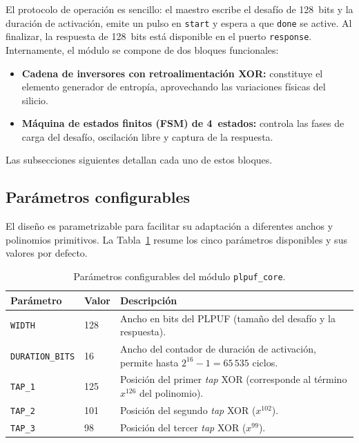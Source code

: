 El protocolo de operación es sencillo: el maestro escribe el desafío de
128~bits y la duración de activación, emite un pulso en \texttt{start} y
espera a que \texttt{done} se active. Al finalizar, la respuesta de
128~bits está disponible en el puerto \texttt{response}. Internamente, el
módulo se compone de dos bloques funcionales:

\begin{itemize}
  \item \textbf{Cadena de inversores con retroalimentación XOR:} constituye
    el elemento generador de entropía, aprovechando las variaciones físicas
    del silicio.
  \item \textbf{Máquina de estados finitos (FSM) de 4~estados:} controla las
    fases de carga del desafío, oscilación libre y captura de la respuesta.
\end{itemize}

Las subsecciones siguientes detallan cada uno de estos bloques.

\subsection{Parámetros configurables}
\label{sec:parametros}

El diseño es parametrizable para facilitar su adaptación a diferentes anchos
y polinomios primitivos. La Tabla~\ref{tab:params} resume los cinco
parámetros disponibles y sus valores por defecto.

\begin{table}[htbp]
\centering
\caption{Parámetros configurables del módulo \texttt{plpuf\_core}.}
\label{tab:params}
\begin{tabular}{llp{7cm}}
\hline
\textbf{Parámetro} & \textbf{Valor} & \textbf{Descripción} \\
\hline
\texttt{WIDTH}          & 128 & Ancho en bits del PLPUF (tamaño del desafío y la respuesta). \\
\texttt{DURATION\_BITS} & 16  & Ancho del contador de duración de activación, permite hasta $2^{16}-1 = 65\,535$ ciclos. \\
\texttt{TAP\_1}         & 125 & Posición del primer \textit{tap} XOR (corresponde al término $x^{126}$ del polinomio). \\
\texttt{TAP\_2}         & 101 & Posición del segundo \textit{tap} XOR ($x^{102}$). \\
\texttt{TAP\_3}         & 98  & Posición del tercer \textit{tap} XOR ($x^{99}$). \\
\hline
\end{tabular}
\end{table}

